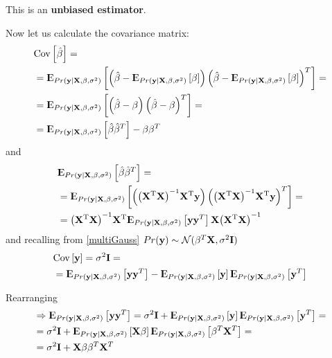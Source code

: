 \documentclass[12pt, letterpaper]{article}
\theoremstyle{definition}
\newcommand{\E}{{\rm I\kern-.3em E}}
\newcommand{\Cov}{\mathrm{Cov}}
\newcommand{\X}{\mathrm{\mathbf{X}}}
\newcommand{\y}{\mathbf{y}}
\newcommand{\inv}{\mathrm{\left( \X^T\X\right)^{-1}}}
\newcommand{\HM}{\mathrm{\inv\X^T}}
\newcommand{\hb}{\mathrm{\hat{\mathbf{\beta}}}}
\begin{document}
This is an \textbf{unbiased estimator}.

Now let us calculate the covariance matrix:
\begin{equation}
\begin{aligned}
&\Cov \left[\hb \right] = \\
&=\E_{Pr(\y|\X,\beta, \sigma^2)}\left[ \left( \hb -\E_{Pr(\y|\X,\beta, \sigma^2)}\left[ \beta\right] \right) \left( \hb -\E_{Pr(\y|\X,\beta, \sigma^2)}\left[ \beta\right] \right)^T\right] = \\
&=\E_{Pr(\y|\X,\beta, \sigma^2)}\left[ \left( \hb - \beta \right) \left( \hb - \beta \right)^T\right] =\\
&=\E_{Pr(\y|\X,\beta, \sigma^2)}\left[ \hb\hb^T\right] -\beta\beta^T\end{aligned}
\end{equation}
and
\begin{equation}
\begin{aligned}
&\E_{Pr(\y|\X,\beta, \sigma^2)}\left[ \hb\hb^T\right] = \\
&=\E_{Pr(\y|\X,\beta, \sigma^2)} \left[ \left( \HM \y\right)\left( \HM \y\right)^T\right] = \\
& = \HM\E_{Pr(\y|\X,\beta, \sigma^2)} \left[   \y  \y^T\right] \X \inv
\end{aligned}
\end{equation}
and recalling from \ref{multiGauss} $Pr(\y) \sim \CMcal{N}(\beta^T \X ,\sigma^2 \mathbf{I})$
\begin{equation}
\begin{aligned}
&\Cov\left[ \y\right]=\sigma^2 \mathbf{I} =\\
&=\E_{Pr(\y|\X,\beta, \sigma^2)}\left[ \y\y^T\right]  - \E_{Pr(\y|\X,\beta, \sigma^2)}\left[ \y\right]\E_{Pr(\y|\X,\beta, \sigma^2)}\left[ \y^T\right]\\
\end{aligned}
\end{equation}

Rearranging
\begin{equation}
\begin{aligned}
&\Rightarrow \E_{Pr(\y|\X,\beta, \sigma^2)}\left[ \y\y^T\right] = \sigma^2 \mathbf{I} +\E_{Pr(\y|\X,\beta, \sigma^2)}\left[ \y\right]\E_{Pr(\y|\X,\beta, \sigma^2)}\left[ \y^T\right] =\\
&=\sigma^2 \mathbf{I} +\E_{Pr(\y|\X,\beta, \sigma^2)}\left[ \X\beta\right]\E_{Pr(\y|\X,\beta, \sigma^2)}\left[ \beta^T\X^T\right] =\\
&= \sigma^2 \mathbf{I} +\X\beta \beta^T\X^T
\end{aligned}
\end{equation}
\end{document}

